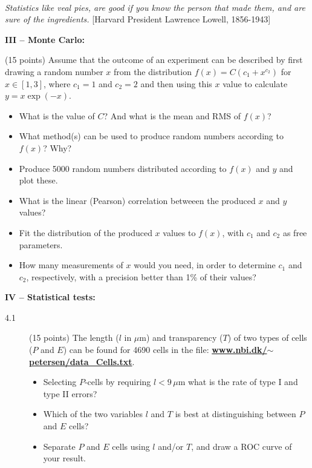 \documentclass[11pt]{article}
\begin{document}

\noindent
\hrulefill\\
\emph{Statistics like veal pies, are good if you know the person that made them, and are sure of the ingredients.}
  \phantom{} \hfill [Harvard President Lawrence Lowell, 1856-1943]\\[-2ex]



\newpage

\noindent
{\bf III -- Monte Carlo:}
\begin{description}
\vspace*{-1ex}
\item[3.1] (15 points) Assume that the outcome of an experiment can be described by
  first drawing a random number $x$ from the distribution $f(x) = C (c_1 + x^{c_2})$ for $x \in [1, 3]$,
  where $c_1 = 1$ and $c_2 = 2$ and then using this $x$ value to calculate $y = x \exp(-x)$.
  \begin{itemize}
    \item What is the value of $C$? And what is the mean and RMS of $f(x)$?
    \item What method(s) can be used to produce random numbers according to $f(x)$? Why?
    \item Produce 5000 random numbers distributed according to $f(x)$ and $y$ and plot these.
    \item What is the linear (Pearson) correlation betweeen the produced $x$ and $y$ values?
    \item Fit the distribution of the produced $x$ values to $f(x)$, with $c_1$ and $c_2$ as free parameters.
    \item How many measurements of $x$ would you need, in order to determine $c_1$ and $c_2$,
      respectively, with a precision better than 1\% of their values?
  \end{itemize}
\end{description}



\noindent
{\bf IV -- Statistical tests:}
\begin{description}
\item[4.1] (15 points)
  The length ($l$ in $\mu$m) and transparency ($T$) of two types of cells ($P$ and $E$) can be found for
  4690 cells in the file:
  \href{http://www.nbi.dk/~petersen/data\_Cells.txt}{\bf www.nbi.dk/$\sim$petersen/data\_Cells.txt}.
  \vspace*{-1ex}
  \begin{itemize}
    \item Selecting $P$-cells by requiring $l < 9 \,\mu$m what is the rate of type I and type II errors?
    \item Which of the two variables $l$ and $T$ is best at distinguishing between $P$ and $E$ cells?
    \item Separate $P$ and $E$ cells using $l$ and/or $T$, and draw a ROC curve of your result.
  \end{itemize}
\end{description}
\end{document}

